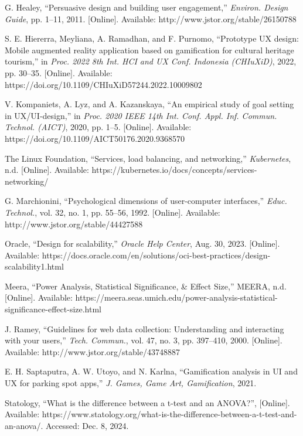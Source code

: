 \documentclass[conference]{IEEEtran}
\begin{document}
\begin{thebibliography}{00}
 G. Healey, ``Persuasive design and building user engagement,'' \textit{Environ. Design Guide}, pp. 1–11, 2011. [Online]. Available: http://www.jstor.org/stable/26150788

 S. E. Hiererra, Meyliana, A. Ramadhan, and F. Purnomo, ``Prototype UX design: Mobile augmented reality application based on gamification for cultural heritage tourism,'' in \textit{Proc. 2022 8th Int. HCI and UX Conf. Indonesia (CHIuXiD)}, 2022, pp. 30–35. [Online]. Available: https://doi.org/10.1109/CHIuXiD57244.2022.10009802

 V. Kompaniets, A. Lyz, and A. Kazanskaya, ``An empirical study of goal setting in UX/UI-design,'' in \textit{Proc. 2020 IEEE 14th Int. Conf. Appl. Inf. Commun. Technol. (AICT)}, 2020, pp. 1–5. [Online]. Available: https://doi.org/10.1109/AICT50176.2020.9368570

 The Linux Foundation, ``Services, load balancing, and networking,'' \textit{Kubernetes}, n.d. [Online]. Available: https://kubernetes.io/docs/concepts/services-networking/

 G. Marchionini, ``Psychological dimensions of user-computer interfaces,'' \textit{Educ. Technol.}, vol. 32, no. 1, pp. 55–56, 1992. [Online]. Available: http://www.jstor.org/stable/44427588

 Oracle, ``Design for scalability,'' \textit{Oracle Help Center}, Aug. 30, 2023. [Online]. Available: https://docs.oracle.com/en/solutions/oci-best-practices/design-scalability1.html

 Meera, ``Power Analysis, Statistical Significance, \& Effect Size,'' MEERA, n.d. [Online]. Available: https://meera.seas.umich.edu/power-analysis-statistical-significance-effect-size.html

 J. Ramey, ``Guidelines for web data collection: Understanding and interacting with your users,'' \textit{Tech. Commun.}, vol. 47, no. 3, pp. 397–410, 2000. [Online]. Available: http://www.jstor.org/stable/43748887

 E. H. Saptaputra, A. W. Utoyo, and N. Karlna, ``Gamification analysis in UI and UX for parking spot apps,'' \textit{J. Games, Game Art, Gamification}, 2021.

 Statology, ``What is the difference between a t-test and an ANOVA?'', [Online]. Available: https://www.statology.org/what-is-the-difference-between-a-t-test-and-an-anova/. Accessed: Dec. 8, 2024.


\end{thebibliography}
\end{document}

